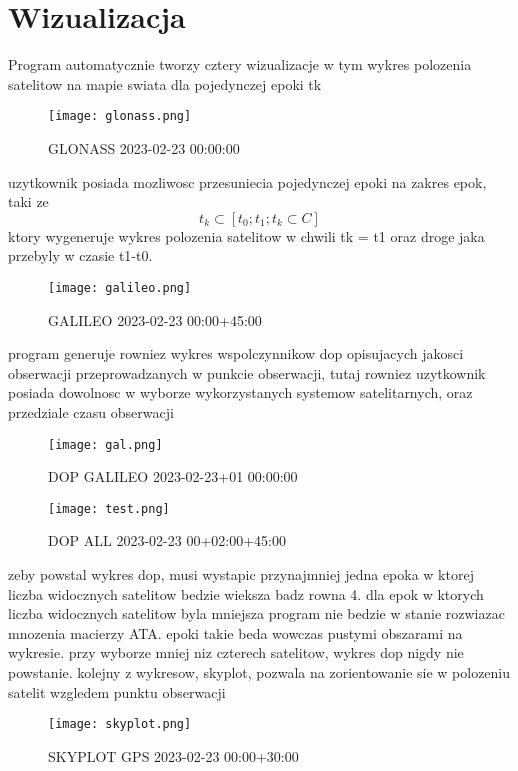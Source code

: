 \documentclass[twocolumn]{article}
\begin{document}
\section{Wizualizacja}
Program automatycznie tworzy cztery wizualizacje w tym wykres polozenia satelitow na mapie swiata dla pojedynczej epoki tk
\begin{figure}[h]
    \centering
    \caption{GLONASS 2023-02-23 00:00:00}
    \texttt{[image: glonass.png]}
\end{figure}
\newline
uzytkownik posiada mozliwosc przesuniecia pojedynczej epoki na zakres epok, taki ze
\begin{equation}
t_k \subset [t_0;t_1;t_k\subset C]
\end{equation}
\newline
ktory wygeneruje wykres polozenia satelitow w chwili tk = t1 oraz droge jaka przebyly w czasie t1-t0.
\begin{figure}[h]
    \centering
    \caption{GALILEO 2023-02-23 00:00+45:00}
    \texttt{[image: galileo.png]}
\end{figure}
\newline program generuje rowniez wykres wspolczynnikow dop opisujacych jakosci obserwacji przeprowadzanych w punkcie obserwacji, tutaj rowniez uzytkownik posiada dowolnosc w wyborze wykorzystanych systemow satelitarnych, oraz przedziale czasu obserwacji
\begin{figure}[h]
\caption{DOP GALILEO 2023-02-23+01 00:00:00}
\texttt{[image: gal.png]}
\centering
\end{figure}
\begin{figure}[h]
\caption{DOP ALL 2023-02-23 00+02:00+45:00}
\texttt{[image: test.png]}
\centering
\end{figure}
\newline zeby powstal wykres dop, musi wystapic przynajmniej jedna epoka w ktorej liczba widocznych satelitow bedzie wieksza badz rowna 4. dla epok w ktorych liczba widocznych satelitow byla mniejsza program nie bedzie w stanie rozwiazac mnozenia macierzy ATA. epoki takie beda wowczas pustymi obszarami na wykresie. przy wyborze mniej niz czterech satelitow, wykres dop nigdy nie powstanie. kolejny z wykresow, skyplot, pozwala na zorientowanie sie w polozeniu satelit wzgledem punktu obserwacji
\begin{figure}[h]
\caption{SKYPLOT GPS 2023-02-23 00:00+30:00}
\texttt{[image: skyplot.png]}
\centering
\end{figure}
\end{document}
